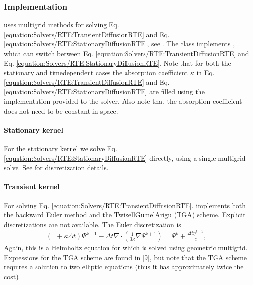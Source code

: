 \documentclass[letterpaper,10pt,english]{sphinxmanual}
\begin{document}
\subsubsection{Implementation}
\label{\detokenize{Solvers/RTE:implementation}}
\sphinxAtStartPar
{} uses multigrid methods for solving Eq. \ref{equation:Solvers/RTE:TransientDiffusionRTE} and Eq. \ref{equation:Solvers/RTE:StationaryDiffusionRTE}, see {\hyperref[\detokenize{Source/LinearSolvers:chap-linearsolvers}]{}}.
The class implements , which can switch between Eq. \ref{equation:Solvers/RTE:TransientDiffusionRTE} and Eq. \ref{equation:Solvers/RTE:StationaryDiffusionRTE}.
Note that for both the stationary and time\sphinxhyphen{}dependent cases the absorption coefficient \(\kappa\) in Eq. \ref{equation:Solvers/RTE:TransientDiffusionRTE} and Eq. \ref{equation:Solvers/RTE:StationaryDiffusionRTE} are filled using the  implementation provided to the solver.
Also note that the absorption coefficient does not need to be constant in space.


\paragraph{Stationary kernel}
\label{\detokenize{Solvers/RTE:stationary-kernel}}
\sphinxAtStartPar
For the stationary kernel we solve Eq. \ref{equation:Solvers/RTE:StationaryDiffusionRTE} directly, using a single multigrid solve.
See {\hyperref[\detokenize{Source/LinearSolvers:chap-linearsolvers}]{}} for discretization details.


\paragraph{Transient kernel}
\label{\detokenize{Solvers/RTE:transient-kernel}}
\sphinxAtStartPar
For solving Eq. \ref{equation:Solvers/RTE:TransientDiffusionRTE},  implements both the backward Euler method and the Twizell\sphinxhyphen{}Gumel\sphinxhyphen{}Arigu (TGA) scheme.
Explicit discretizations are not available.
The Euler discretization is
\begin{equation*}
\begin{split}\left(1+ \kappa \Delta t\right)\Psi^{k+1} - \Delta t \nabla\cdot\left(\frac{1}{3\kappa}\nabla\Psi^{k+1}\right) = \Psi^{k} + \frac{\Delta t\eta^{k+1}}{c},\end{split}
\end{equation*}
\sphinxAtStartPar
Again, this is a Helmholtz equation for  which is solved using geometric multigrid.
Expressions for the TGA scheme are found in {[}\hyperlink{cite.ZZReferences:id34}{9}{]}, but note that the TGA scheme requires a solution to two elliptic equations (thus it has approximately twice the cost).
\end{document}
